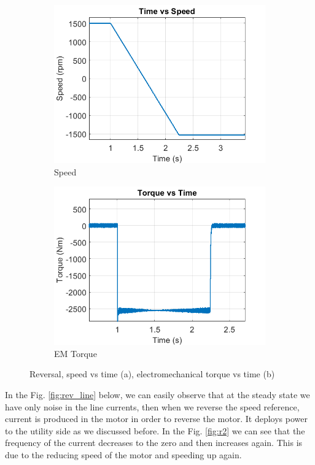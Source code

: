 \begin{figure}[H]
        \centering
        \begin{subfigure}[b]{0.475\textwidth}
            \centering
            \includegraphics[width = 8 cm]{figs/reverse_sv_speed.png}
            \caption{Speed }
            \label{fig:r_s}
        \end{subfigure}
        \hfill
        \begin{subfigure}[b]{0.475\textwidth}  
            \centering 
            \includegraphics[width = 8 cm]{figs/reverse_sv_torque.png}
            \caption{EM Torque}
            \label{fig:r_t}
        \end{subfigure}
        \caption{Reversal, speed vs time (a), electromechanical torque vs time (b)}
        \label{fig:rev}
        \end{figure}

In the Fig. \ref{fig:rev_line} below, we can easily observe that at the steady state we have only noise in the line currents, then when we reverse the speed reference, current is produced in the motor in order to reverse the motor. It deploys power to the utility side as we discussed before. In the Fig. \ref{fig:r2} we can see that the frequency of the current decreases to the zero and then increases again. This is due to the reducing speed of the motor and speeding up again.       
        
